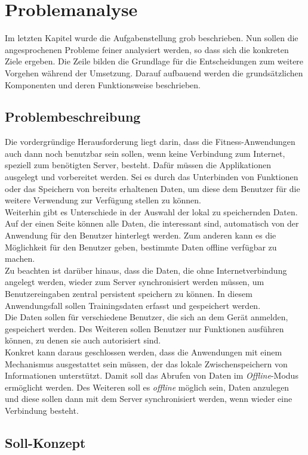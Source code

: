 \chapter{Problemanalyse}
\label{cha:problemanalyse}
Im letzten Kapitel wurde die Aufgabenstellung grob beschrieben. Nun sollen die angesprochenen Probleme feiner analysiert werden, so dass sich die konkreten Ziele ergeben. Die Zeile bilden die Grundlage für die Entscheidungen zum weitere Vorgehen während der Umsetzung. Darauf aufbauend werden die grundsätzlichen Komponenten und deren Funktionsweise beschrieben.
\section{Problembeschreibung}
\label{sec:problembeschreibung}
Die vordergründige Herausforderung liegt darin, dass die Fitness-Anwendungen auch dann noch benutzbar sein sollen, wenn keine Verbindung zum Internet, speziell zum benötigten Server, besteht. Dafür müssen die Applikationen ausgelegt und vorbereitet werden. Sei es durch das Unterbinden von Funktionen oder das Speichern von bereits erhaltenen Daten, um diese dem Benutzer für die weitere Verwendung zur Verfügung stellen zu können. \\
Weiterhin gibt es Unterschiede in der Auswahl der lokal zu speichernden Daten. Auf der einen Seite können alle Daten, die interessant sind, automatisch von der Anwendung für den Benutzer hinterlegt werden. Zum anderen kann es die Möglichkeit für den Benutzer geben, bestimmte Daten offline verfügbar zu machen.\\
Zu beachten ist darüber hinaus, dass die Daten, die ohne Internetverbindung angelegt werden, wieder zum Server synchronisiert werden müssen, um Benutzereingaben zentral persistent speichern zu können. In diesem Anwendungsfall sollen Trainingsdaten erfasst und gespeichert werden.\\
Die Daten sollen für verschiedene Benutzer, die sich an dem Gerät anmelden, gespeichert werden. Des Weiteren sollen Benutzer nur Funktionen ausführen können, zu denen sie auch autorisiert sind.\\
Konkret kann daraus geschlossen werden, dass die Anwendungen mit einem Mechanismus ausgestattet sein müssen, der das lokale Zwischenspeichern von Informationen unterstützt. Damit soll das Abrufen von Daten im \textit{Offline}-Modus ermöglicht werden. Des Weiteren soll es \textit{offline} möglich sein, Daten anzulegen und diese sollen dann mit dem Server synchronisiert werden, wenn wieder eine Verbindung besteht.\section{Soll-Konzept}
\label{sec:soll-konzept}

